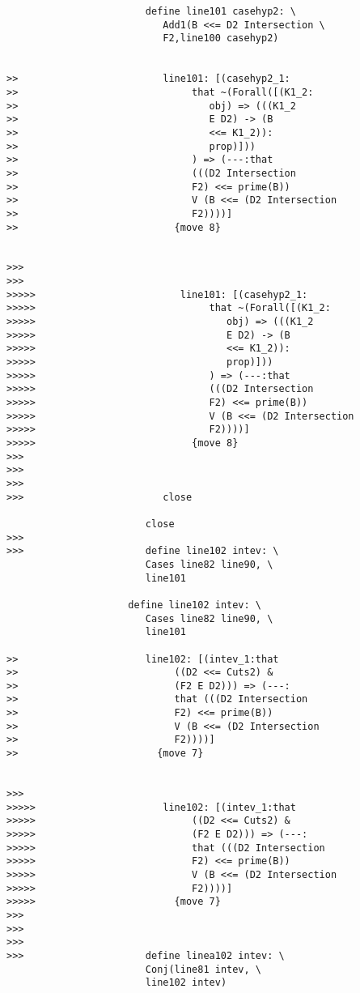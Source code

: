 \documentclass[12pt]{article}
\begin{document}
\begin{verbatim}
                        define line101 casehyp2: \
                           Add1(B <<= D2 Intersection \
                           F2,line100 casehyp2)


>>                         line101: [(casehyp2_1:
>>                              that ~(Forall([(K1_2:
>>                                 obj) => (((K1_2
>>                                 E D2) -> (B
>>                                 <<= K1_2)):
>>                                 prop)]))
>>                              ) => (---:that
>>                              (((D2 Intersection
>>                              F2) <<= prime(B))
>>                              V (B <<= (D2 Intersection
>>                              F2))))]
>>                           {move 8}


>>>
>>>
>>>>>                         line101: [(casehyp2_1:
>>>>>                              that ~(Forall([(K1_2:
>>>>>                                 obj) => (((K1_2
>>>>>                                 E D2) -> (B
>>>>>                                 <<= K1_2)):
>>>>>                                 prop)]))
>>>>>                              ) => (---:that
>>>>>                              (((D2 Intersection
>>>>>                              F2) <<= prime(B))
>>>>>                              V (B <<= (D2 Intersection
>>>>>                              F2))))]
>>>>>                           {move 8}
>>>
>>>
>>>
>>>                        close

                        close
>>>
>>>                     define line102 intev: \
                        Cases line82 line90, \
                        line101

                     define line102 intev: \
                        Cases line82 line90, \
                        line101

>>                      line102: [(intev_1:that
>>                           ((D2 <<= Cuts2) &
>>                           (F2 E D2))) => (---:
>>                           that (((D2 Intersection
>>                           F2) <<= prime(B))
>>                           V (B <<= (D2 Intersection
>>                           F2))))]
>>                        {move 7}


>>>
>>>>>                      line102: [(intev_1:that
>>>>>                           ((D2 <<= Cuts2) &
>>>>>                           (F2 E D2))) => (---:
>>>>>                           that (((D2 Intersection
>>>>>                           F2) <<= prime(B))
>>>>>                           V (B <<= (D2 Intersection
>>>>>                           F2))))]
>>>>>                        {move 7}
>>>
>>>
>>>
>>>                     define linea102 intev: \
                        Conj(line81 intev, \
                        line102 intev)


\end{verbatim}
\end{document}

